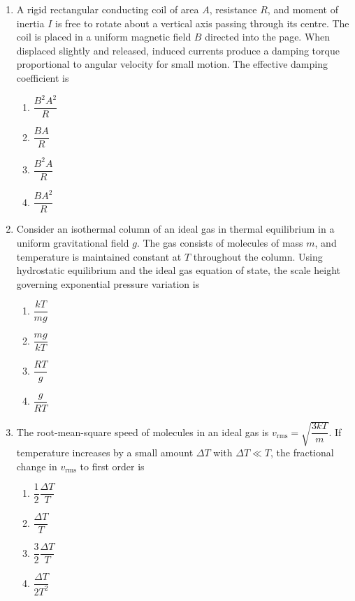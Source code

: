\documentclass[12pt]{article}
\begin{document}
\begin{enumerate}[leftmargin=*]
\item A rigid rectangular conducting coil of area $A$, resistance $R$, and moment of inertia $I$ is free to rotate about a vertical axis passing through its centre. The coil is placed in a uniform magnetic field $B$ directed into the page. When displaced slightly and released, induced currents produce a damping torque proportional to angular velocity for small motion. The effective damping coefficient is

\begin{enumerate}
\item $\dfrac{B^2 A^2}{R}$
\item $\dfrac{BA}{R}$
\item $\dfrac{B^2 A}{R}$
\item $\dfrac{B A^2}{R}$
\end{enumerate}

\item Consider an isothermal column of an ideal gas in thermal equilibrium in a uniform gravitational field $g$. The gas consists of molecules of mass $m$, and temperature is maintained constant at $T$ throughout the column. Using hydrostatic equilibrium and the ideal gas equation of state, the scale height governing exponential pressure variation is

\begin{enumerate}
\item $\dfrac{kT}{mg}$
\item $\dfrac{mg}{kT}$
\item $\dfrac{RT}{g}$
\item $\dfrac{g}{RT}$
\end{enumerate}

\item The root-mean-square speed of molecules in an ideal gas is $v_{\text{rms}}=\sqrt{\dfrac{3kT}{m}}$. If temperature increases by a small amount $\Delta T$ with $\Delta T \ll T$, the fractional change in $v_{\text{rms}}$ to first order is

\begin{enumerate}
\item $\dfrac{1}{2}\dfrac{\Delta T}{T}$
\item $\dfrac{\Delta T}{T}$
\item $\dfrac{3}{2}\dfrac{\Delta T}{T}$
\item $\dfrac{\Delta T}{2T^2}$
\end{enumerate}


\end{enumerate}
\end{document}
